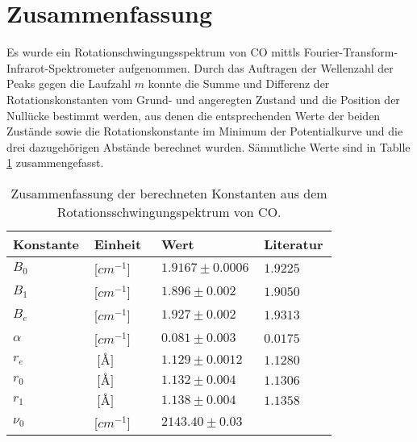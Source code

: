 % 
%
\section{Zusammenfassung}
Es wurde ein Rotationschwingungsspektrum von CO mittls Fourier-Transform-Infrarot-Spektrometer aufgenommen. Durch das Auftragen der Wellenzahl der Peaks gegen die Laufzahl $m$ konnte die Summe und Differenz der Rotationskonstanten vom Grund- und angeregten Zustand und die Position der Nullücke bestimmt werden, aus denen die entsprechenden Werte der beiden Zustände sowie die Rotationskonstante im Minimum der Potentialkurve und die drei dazugehörigen Abstände berechnet wurden. Sämmtliche Werte sind in Tablle \ref{Zusammenfassung} zusammengefasst.

\begin{table}

	\caption{Zusammenfassung der berechneten Konstanten aus dem Rotationsschwingungspektrum von CO.  }
\begin{tabular}{C{0.2\linewidth}|C{0.2\linewidth}|C{0.2\linewidth}|C{0.2\linewidth}}
Konstante             & Einheit                  & Wert                           & Literatur \\ \hline
$B_0$                  & [$cm^{-1}$]          & $1.9167 \pm 0.0006$	& $1.9225$   \\
$B_1$                  & [$cm^{-1}$]          & $1.896 \pm 0.002$   	& $1.9050$   \\
$B_e $                 & [$cm^{-1}$]          & $1.927 \pm 0.002$   	& $1.9313$   \\
$\alpha$		& [$cm^{-1}$]       & $0.081 \pm 0.003$   	& $0.0175$   \\
$r_e$                  & $\SI{}{[\angstrom]}$		& $1.129 \pm 0.0012 $  	& $1.1280$     \\
$r_0$                  & $\SI{}{[\angstrom]} $		& $1.132 \pm 0.004$  	 & $1.1306$     \\
$r_1$                  & $\SI{}{[\angstrom]}$ 		& $1.138 \pm 0.004$  	 & $1.1358$    \\
$\nu_0$	&[$cm^{-1}$]          & $2143.40 \pm 0.03$&
\label{Zusammenfassung}
\end{tabular}
\end{table}


%